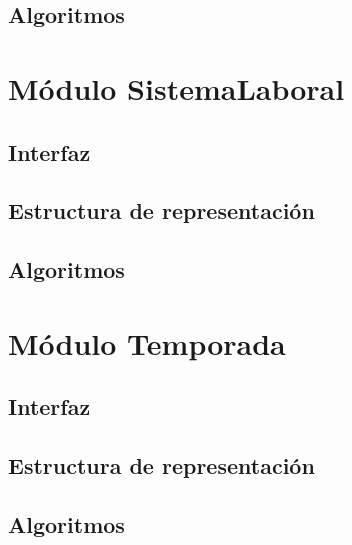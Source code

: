 \documentclass[10pt, a4paper]{article}
\begin{document}
\subsection{Algoritmos}

\newpage

\section{Módulo SistemaLaboral} 
\subsection{Interfaz}

\subsection{Estructura de representaci\'on}

\subsection{Algoritmos}

\newpage

\section{Módulo Temporada} 
\subsection{Interfaz}

\subsection{Estructura de representaci\'on}

\subsection{Algoritmos}

\newpage
\end{document}
